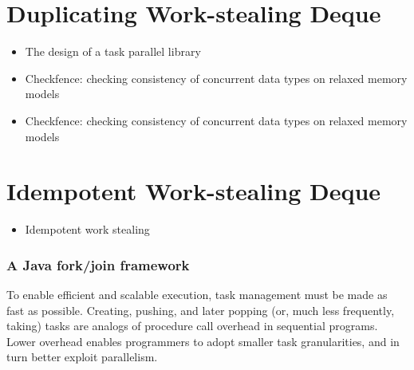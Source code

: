 

\section{Duplicating Work-stealing Deque}
\label{sec:queues-implementation-duplicating-ws-deque}

\begin{itemize}
\item The design of a task parallel library \cite{Leijen2009}
\item Checkfence: checking consistency of concurrent data types on
  relaxed memory models \cite{Burckhardt2007}
\item Checkfence: checking consistency of concurrent data types on
  relaxed memory models \cite{Burckhardt2007a}
\end{itemize}




\section{Idempotent Work-stealing Deque}
\label{sec:queues-implementation-idempotent-ws-deque}

\begin{itemize}
\item Idempotent work stealing \cite{Michael2009}
\end{itemize}



\subsubsection{A Java fork/join framework \cite{Lea2000}}


To enable efficient and scalable execution, task management must be
made as fast as possible. Creating, pushing, and later popping (or,
much less frequently, taking) tasks are analogs of procedure call
overhead in sequential programs. Lower overhead enables programmers to
adopt smaller task granularities, and in turn better exploit
parallelism.

